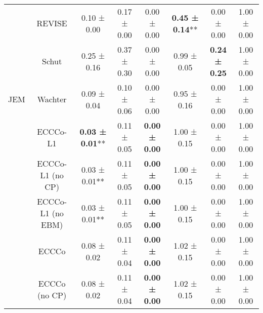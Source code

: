 \begin{table}
{\begin{tabular}[t]{cccccccc}
 & REVISE & 0.10 ± 0.00\hphantom{*}\hphantom{*} & 0.17 ± 0.00\hphantom{*}\hphantom{*} & 0.00 ± 0.00\hphantom{*}\hphantom{*} & \textbf{0.45 ± 0.14}** & 0.00 ± 0.00\hphantom{*}\hphantom{*} & 1.00 ± 0.00\hphantom{*}\hphantom{*}\\

 & Schut & 0.25 ± 0.16\hphantom{*}\hphantom{*} & 0.37 ± 0.30\hphantom{*}\hphantom{*} & 0.00 ± 0.00\hphantom{*}\hphantom{*} & 0.99 ± 0.05\hphantom{*}\hphantom{*} & \textbf{0.24 ± 0.25}\hphantom{*}\hphantom{*} & 1.00 ± 0.00\hphantom{*}\hphantom{*}\\

\multirow[t]{-9}{*}{\centering\arraybackslash JEM} & Wachter & 0.09 ± 0.04\hphantom{*}\hphantom{*} & 0.10 ± 0.06\hphantom{*}\hphantom{*} & 0.00 ± 0.00\hphantom{*}\hphantom{*} & 0.95 ± 0.16\hphantom{*}\hphantom{*} & 0.00 ± 0.00\hphantom{*}\hphantom{*} & 1.00 ± 0.00\hphantom{*}\hphantom{*}\\
\cmidrule{1-8}
 & ECCCo-L1 & \textbf{0.03 ± 0.01}** & 0.11 ± 0.05\hphantom{*}\hphantom{*} & \textbf{0.00 ± 0.00}\hphantom{*}\hphantom{*} & 1.00 ± 0.15\hphantom{*}\hphantom{*} & 0.00 ± 0.00\hphantom{*}\hphantom{*} & 1.00 ± 0.00\hphantom{*}\hphantom{*}\\

 & ECCCo-L1 (no CP) & 0.03 ± 0.01** & 0.11 ± 0.05\hphantom{*}\hphantom{*} & \textbf{0.00 ± 0.00}\hphantom{*}\hphantom{*} & 1.00 ± 0.15\hphantom{*}\hphantom{*} & 0.00 ± 0.00\hphantom{*}\hphantom{*} & 1.00 ± 0.00\hphantom{*}\hphantom{*}\\

 & ECCCo-L1 (no EBM) & 0.03 ± 0.01** & 0.11 ± 0.05\hphantom{*}\hphantom{*} & \textbf{0.00 ± 0.00}\hphantom{*}\hphantom{*} & 1.00 ± 0.15\hphantom{*}\hphantom{*} & 0.00 ± 0.00\hphantom{*}\hphantom{*} & 1.00 ± 0.00\hphantom{*}\hphantom{*}\\

 & ECCCo & 0.08 ± 0.02\hphantom{*}\hphantom{*} & 0.11 ± 0.04\hphantom{*}\hphantom{*} & \textbf{0.00 ± 0.00}\hphantom{*}\hphantom{*} & 1.02 ± 0.15\hphantom{*}\hphantom{*} & 0.00 ± 0.00\hphantom{*}\hphantom{*} & 1.00 ± 0.00\hphantom{*}\hphantom{*}\\

 & ECCCo (no CP) & 0.08 ± 0.02\hphantom{*}\hphantom{*} & 0.11 ± 0.04\hphantom{*}\hphantom{*} & \textbf{0.00 ± 0.00}\hphantom{*}\hphantom{*} & 1.02 ± 0.15\hphantom{*}\hphantom{*} & 0.00 ± 0.00\hphantom{*}\hphantom{*} & 1.00 ± 0.00\hphantom{*}\hphantom{*}\\


\end{tabular}}
\end{table}
